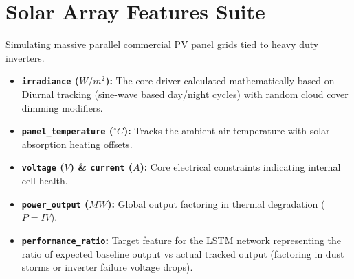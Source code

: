 \documentclass[11pt, a4paper]{article}
\begin{document}
\section{Solar Array Features Suite}
Simulating massive parallel commercial PV panel grids tied to heavy duty inverters.
\begin{itemize}
    \item \textbf{\texttt{irradiance} ($W/m^2$):} The core driver calculated mathematically based on Diurnal tracking (sine-wave based day/night cycles) with random cloud cover dimming modifiers.
    \item \textbf{\texttt{panel\_temperature} ($^{\circ}C$):} Tracks the ambient air temperature with solar absorption heating offsets. 
    \item \textbf{\texttt{voltage} ($V$) \& \textbf{\texttt{current}} ($A$):} Core electrical constraints indicating internal cell health.
    \item \textbf{\texttt{power\_output} ($MW$):} Global output factoring in thermal degradation ($P=IV$).
    \item \textbf{\texttt{performance\_ratio}:} Target feature for the LSTM network representing the ratio of expected baseline output vs actual tracked output (factoring in dust storms or inverter failure voltage drops).
\end{itemize}
\end{document}
